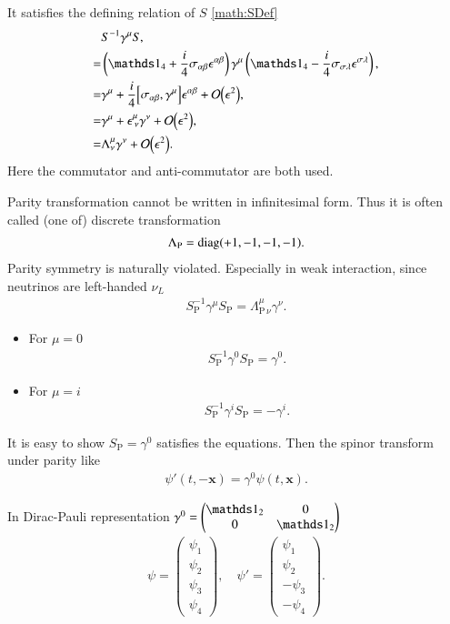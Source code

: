 It satisfies the defining relation of $S$ \ref{math:SDef}
\begin{align*}
   & S^{-1} \gamma^\mu S,  \\
   =&\left(\id_4 + \frac{i}{4} \sigma_{\alpha \beta} \epsilon^{\alpha \beta} \right) \gamma^\mu \left(\id_4 - \frac{i}{4} \sigma_{\sigma \lambda} \epsilon^{\sigma \lambda}\right), \\
   =& \gamma^\mu + \frac{i}{4} \comm{\sigma_{\alpha\beta}}{\gamma^\mu}\epsilon^{\alpha \beta} + \order{\epsilon^2},  \\
   =& \gamma^\mu + \epsilon^\mu_{\; \nu} \gamma^\nu+ \order{\epsilon^2}, \\
   =& \Lambda^\mu_\nu \gamma^\nu + \order{\epsilon^2}.
\end{align*}
Here the commutator and anti-commutator are both used.

Parity transformation cannot be written in infinitesimal form. Thus it is often called (one of) discrete transformation
\begin{align}
\Lambda_{\text{P}} = \text{diag}(+1,-1,-1,-1).
\end{align}
Parity symmetry is naturally violated. Especially in weak interaction, since neutrinos are left-handed $\nu_L$
\begin{align}
   S^{-1}_\text{P} \gamma^\mu S_\text{P} = \Lambda^\mu_{\text{P}\, \nu} \gamma^\nu.
\end{align}

\begin{itemize}
   \item For $\mu = 0$ 
      \begin{align*}
S^{-1}_\text{P} \gamma^0 S_\text{P} = \gamma^0.
      \end{align*}
   \item For $\mu=i$
      \begin{align*}
S^{-1}_\text{P} \gamma^i S_\text{P} = -\gamma^i.
      \end{align*}
\end{itemize}

It is easy to show $S_\text{P} = \gamma^0$ satisfies the equations. Then the spinor transform under parity like
\begin{align}
   \psi'(t, -\pmb{x}) = \gamma^0 \psi(t,\pmb{x}).
\end{align}

In Dirac-Pauli representation $\gamma^0 = \begin{pmatrix} \id_2 & 0 \\ 0 & \id_2 \end{pmatrix}$
\begin{align*}
   \psi = \begin{pmatrix} \psi_1 \\ \psi_2 \\ \psi_3 \\ \psi_4 \end{pmatrix}, \quad
   \psi' = \begin{pmatrix} \psi_1 \\ \psi_2 \\ -\psi_3 \\ -\psi_4 \end{pmatrix}.
\end{align*}

